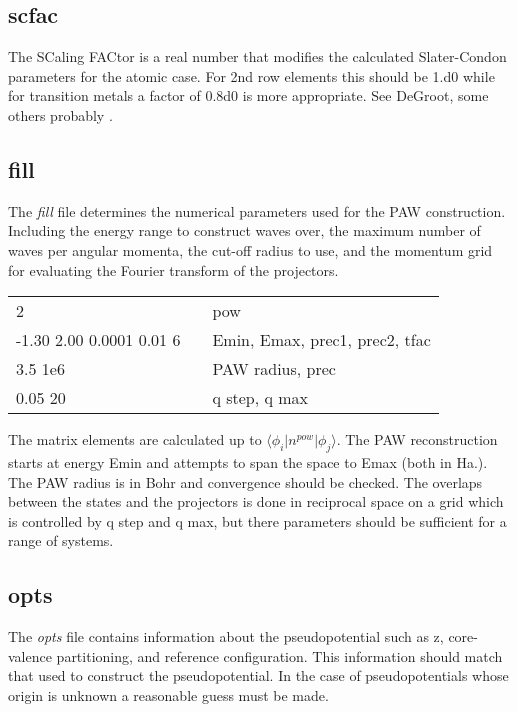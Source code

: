 \documentclass[11pt]{report}
\begin{document}
\subsection{scfac}
The SCaling FACtor is a real number that modifies the calculated Slater-Condon parameters for the atomic case. For 2nd row elements this should be 1.d0 while for transition metals a factor of 0.8d0 is more appropriate. See DeGroot, some others probably \cite{SCFAC}.

\subsection{fill}
\label{fill}
The \emph{fill} file determines the numerical parameters used for the PAW construction. Including the energy range to construct waves over, the maximum number of waves per angular momenta, the cut-off radius to use, and the momentum grid for evaluating the Fourier transform of the projectors. 

\begin{center}
\begin{tabular}{| l | c l |}
\hline
2						& &  pow \\
-1.30 2.00 0.0001 0.01 6		& & Emin, Emax, prec1, prec2, tfac \\
3.5 1e6					& & PAW radius, prec \\
0.05 20					& & q step, q max \\
\hline
\end{tabular}
\end{center}

The matrix elements are calculated up to $\langle \phi_i \vert n^{pow} \vert \phi_j \rangle$. The PAW reconstruction starts at energy Emin and attempts to span the space to Emax (both in Ha.). 
The PAW radius is in Bohr and convergence should be checked. The overlaps between the states and the projectors is done in reciprocal space on a grid which is controlled by q step and q max, but there parameters should be sufficient for a range of systems.


\subsection{opts}
The \emph{opts} file contains information about the pseudopotential such as z, core-valence partitioning, and reference configuration. This information should match that used to construct the pseudopotential. In the case of pseudopotentials 
whose origin is unknown a reasonable guess must be made.
\end{document}
